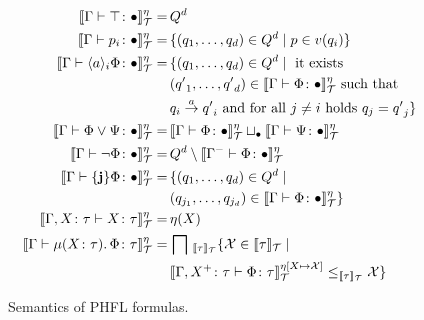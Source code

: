 \begin{figure}
    \caption{Semantics of PHFL formulas.}
    \label{figure:phfl-semantics}
    \begin{align*}
        \llbracket \Gamma \vdash \top \colon \bullet \rrbracket^\eta_\mathcal{T} =\,& Q^d\\
        \llbracket \Gamma \vdash p_i \colon \bullet \rrbracket^\eta_\mathcal{T} =\,& \{(q_1, \dots, q_d) \in Q^d \mid p \in v
        (q_i)\}\\
        \llbracket \Gamma \vdash \langle a \rangle_i \Phi \colon \bullet \rrbracket^\eta_\mathcal{T} =\,& \{(q_1,
        \dots, q_d) \in Q^d \mid \text{ it exists } \\& ({q'}_1, \dots, {q'}_d) \in \llbracket \Gamma \vdash \Phi \colon
\bullet \rrbracket^\eta_\mathcal{T} \text{ such that } \\&q_i \overset{a}{\rightarrow} {q'}_i \text{ and for all } j
        \neq
        i \text{ holds } q_j = {q'}_j\}\\
        \llbracket \Gamma \vdash \Phi \vee \Psi \colon \bullet \rrbracket^\eta_\mathcal{T} =\,& \llbracket \Gamma \vdash \Phi
        \colon \bullet \rrbracket ^\eta_\mathcal{T} \sqcup_\bullet \llbracket \Gamma \vdash \Psi \colon \bullet \rrbracket ^\eta_\mathcal{T}\\
        \llbracket \Gamma \vdash \neg \Phi \colon \bullet \rrbracket^\eta_\mathcal{T} =\,& Q^d \setminus \llbracket
        \Gamma^- \vdash \Phi
        \colon \bullet \rrbracket ^\eta_\mathcal{T}\\
        \llbracket \Gamma \vdash \{\emph{j}\} \Phi \colon \bullet \rrbracket^\eta_\mathcal{T} =\,&
        \{(q_1, \dots, q_d) \in Q^d \mid \\ &(q_{j_1}, \dots, q_{j_d}) \in \llbracket \Gamma \vdash \Phi
        \colon \bullet
        \rrbracket ^\eta_\mathcal{T}\}\\
        \llbracket \Gamma, X \colon \tau \vdash X \colon \tau \rrbracket^\eta_\mathcal{T} =\,& \eta(X)\\
        \llbracket \Gamma \vdash \mu (X \colon \tau).\,\Phi \colon \tau \rrbracket^\eta_\mathcal{T} =\,&
        \bigsqcap\,_{\llbracket\tau\rrbracket_\mathcal{T}} \{\mathcal{X} \in \llbracket \tau \rrbracket_\mathcal{T}
        \mid \\
        &\llbracket \Gamma, X^+ \colon \tau \vdash \Phi \colon \tau \rrbracket^{\eta[X \mapsto \mathcal{X}]}_\mathcal{T}
        \leq_{\llbracket \tau \rrbracket_\mathcal{T}} \mathcal{X}\}\\

\end{align*}
\end{figure}
